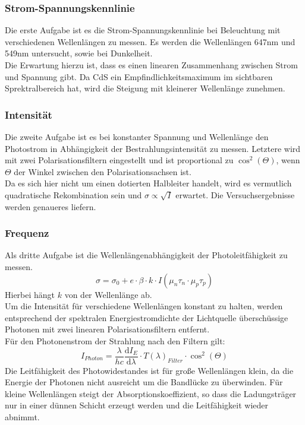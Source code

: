 \subsubsection{Strom-Spannungskennlinie}
Die erste Aufgabe ist es die Strom-Spannungskennlinie bei Beleuchtung mit verschiedenen Wellenlängen zu messen. Es werden die Wellenlängen 647nm und 549nm untersucht, sowie bei Dunkelheit. \\
Die Erwartung hierzu ist, dass es einen linearen Zusammenhang zwischen Strom und Spannung gibt. Da CdS ein Empfindlichkeitsmaximum im sichtbaren Sprektralbereich hat, wird die Steigung mit kleinerer Wellenlänge zunehmen.

\subsubsection{Intensität}
Die zweite Aufgabe ist es bei konstanter Spannung und Wellenlänge den Photostrom in Abhängigkeit der Bestrahlungsintensität zu messen. Letztere wird mit zwei Polarisationsfiltern eingestellt und ist proportional zu $\cos ^{2} (\Theta)$, wenn $\Theta$ der Winkel zwischen den Polarisationsachsen ist. \\
Da es sich hier nicht um einen dotierten Halbleiter handelt, wird es vermutlich quadratische Rekombination sein und $\sigma \propto \sqrt{I}$ erwartet. Die Versuchsergebnisse werden genaueres liefern.

\subsubsection{Frequenz}

Als dritte Aufgabe ist die Wellenlängenabhängigkeit der Photoleitfähigkeit zu messen.
$$\sigma = \sigma_0 + e \cdot \beta \cdot k \cdot I (\mu_n \tau_n \cdot \mu_p \tau_p)$$
Hierbei hängt $k$ von der Wellenlänge ab.\\

Um die Intensität für verschiedene Wellenlängen konstant zu halten, werden entsprechend der spektralen Energiestromdichte der Lichtquelle überschüssige Photonen mit zwei linearen Polarisationsfiltern entfernt.\\
Für den Photonenstrom der Strahlung nach den Filtern gilt: 
$$I_{Photon} = \frac{\lambda}{hc} \frac{\mathrm{d} I_E}{\mathrm{d} \lambda} \cdot T(\lambda)_{Filter} \cdot \cos^2(\Theta)$$
Die Leitfähigkeit des Photowidestandes ist für große Wellenlängen klein, da die Energie der Photonen nicht ausreicht um die Bandlücke zu überwinden. Für kleine Wellenlängen steigt der Absorptionskoeffizient, so dass die Ladungsträger nur in einer dünnen Schicht erzeugt werden und die Leitfähigkeit wieder abnimmt.

